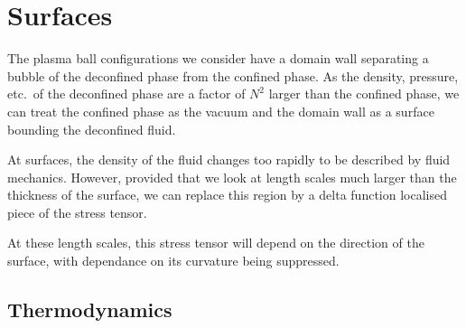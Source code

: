 \documentclass[12pt]{article}
\begin{document}
\section{Surfaces}\label{sec:surface}

The plasma ball configurations we consider have a domain wall separating a bubble of the deconfined phase from the confined phase. As the density, pressure, etc.\ of the deconfined phase are a factor of $N^2$ larger than the confined phase, we can treat the confined phase as the vacuum and the domain wall as a surface bounding the deconfined fluid.

At surfaces, the density of the fluid changes too rapidly to be described by fluid mechanics. However, provided that we look at length scales much larger than the thickness of the surface, we can replace this region by a delta function localised piece of the stress tensor.

At these length scales, this stress tensor will depend on the direction of the surface, with dependance on its curvature being suppressed.

\subsection{Thermodynamics}\label{sec:surftherm}
\end{document}
